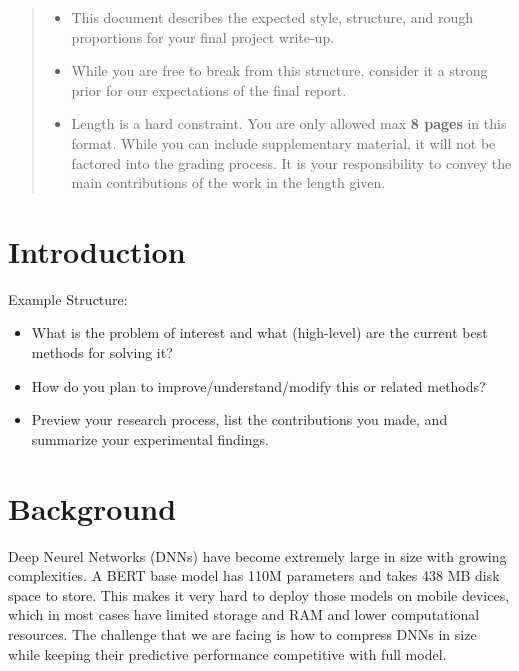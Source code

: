 \documentclass{article}
\begin{document}

\begin{abstract}
  \begin{itemize}
  \item This document describes the expected style, structure, and rough proportions for your final project write-up.
  \item While you are free to break from this structure, consider it a strong prior for our expectations of the final report.
\item Length is a hard constraint. You are only allowed max \textbf{8 pages} in this format. While you can include supplementary material, it will not be factored into the grading process. It is your responsibility to convey the main contributions of the work in the length given.
  \end{itemize}



\end{abstract}

\section{Introduction}
\label{sec:introduction}

Example Structure:
\begin{itemize}
\item What is the problem of interest and what (high-level) are the current best methods for solving it?
\item How do you plan to improve/understand/modify this or related methods?
\item Preview your research process, list the contributions you made, and summarize your experimental findings.
\end{itemize}


\section{Background}
Deep Neurel Networks (DNNs) have become extremely large in size with growing complexities. A BERT base model has 110M parameters and takes 438 MB disk space to store. This makes it very hard to deploy those models on mobile devices, which in most cases have limited storage and RAM and lower computational resources. The challenge that we are facing is how to compress DNNs in size while keeping their predictive performance competitive with full model.
\end{document}

